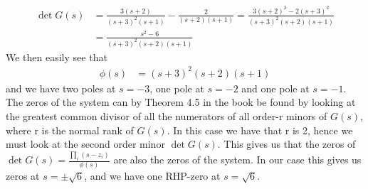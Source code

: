 \documentclass[a4paper]{scrartcl}
\begin{document}
\begin{equation}
	\begin{aligned}
		\det{G(s)} &= \frac{3(s+2)}{(s+3)^2(s+1)} - \frac{2}{(s+2)(s+1)} = \frac{3(s+2)^2 - 2(s+3)^2}{(s+3)^2(s+2)(s+1)}\\
		&= \frac{s^2-6}{(s+3)^2(s+2)(s+1)}
	\end{aligned}
\end{equation}
We then easily see that
\begin{equation}
	\begin{aligned}
		\phi(s) &= (s+3)^2(s+2)(s+1)
	\end{aligned}
\end{equation}
and we have two poles at $s=-3$, one pole at $s=-2$ and one pole at $s=-1$.\\
The zeros of the system can by Theorem 4.5 in the book be found by looking at the greatest common divisor of all the numerators of all order-r minors of $G(s)$, where r is the normal rank of $G(s)$. In this case we have that r is 2, hence we must look at the second order minor $\det{G(s)}$. This gives us that the zeros of $\det{G(s)} = \frac{\prod_i(s-z_i)}{\phi(s)}$ are also the zeros of the system. In our case this gives us zeros at $s = \pm \sqrt{6}$, and we have one RHP-zero at $s=\sqrt{6}$.
\end{document}
